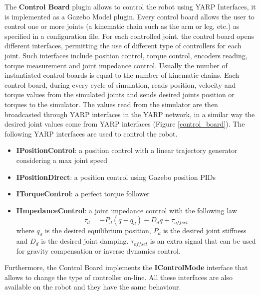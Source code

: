 The \textbf{Control Board} plugin allows to control the robot using YARP Interfaces, it is implemented as a Gazebo Model plugin. Every control board allows the user to control one or more joints (a kinematic chain such as the arm or leg, etc.) as specified in a configuration file. For each controlled joint, the control board opens different interfaces, permitting the use of different type of controllers for each joint. Such interfaces include position control, torque control, encoders reading, torque measurement and joint impedance control. Usually the number of instantiated control boards is equal to the number of kinematic chains. Each control board, during every cycle of simulation, reads position, velocity and torque values from the simulated joints and sends desired joints position or torques to the simulator. The values read from the simulator are then broadcasted through YARP interfaces in the YARP network, in a similar way the desired joint values come from YARP interfaces (Figure \ref{control_board}). The following YARP interfaces are used to control the robot.
\begin{itemize}
\item \textbf{IPositionControl}: a position control with a linear trajectory generator considering a max joint speed
\item \textbf{IPositionDirect}: a position control using Gazebo position PIDs
\item \textbf{ITorqueControl}: a perfect torque follower
\item \textbf{IImpedanceControl}: a joint impedance control with the following law
\begin{equation}
    \tau_d = -P_d(q-q_d) - D_d\dot{q} + \tau_{offset}
\end{equation}
where $q_d$ is the desired equilibrium position, $P_d$ is the desired joint stiffness and $D_d$ is the desired joint damping. $\tau_{offset}$ is an extra signal that can be used for gravity compensation or inverse dynamics control.
\end{itemize}
Furthermore, the Control Board implements the \textbf{IControlMode} interface that allows to change the type of controller on-line. All these interfaces are also available on the robot and they have the same behaviour.
